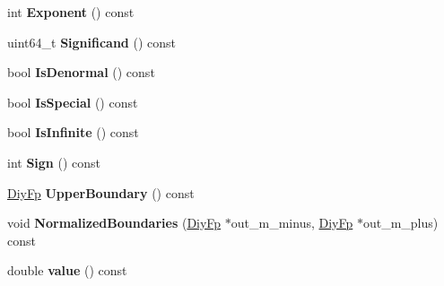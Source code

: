 \begin{DoxyCompactItemize}
\item 
\hypertarget{classv8_1_1internal_1_1_double_ab9695306713296276c93561af462b7d3}{}int {\bfseries Exponent} () const \label{classv8_1_1internal_1_1_double_ab9695306713296276c93561af462b7d3}

\item 
\hypertarget{classv8_1_1internal_1_1_double_aab2ba17924404388a43b18356fb96cd8}{}uint64\+\_\+t {\bfseries Significand} () const \label{classv8_1_1internal_1_1_double_aab2ba17924404388a43b18356fb96cd8}

\item 
\hypertarget{classv8_1_1internal_1_1_double_a2bd3977ee8b66067a0f6724643f18268}{}bool {\bfseries Is\+Denormal} () const \label{classv8_1_1internal_1_1_double_a2bd3977ee8b66067a0f6724643f18268}

\item 
\hypertarget{classv8_1_1internal_1_1_double_a75c994211c852906f1fe88772fc271ac}{}bool {\bfseries Is\+Special} () const \label{classv8_1_1internal_1_1_double_a75c994211c852906f1fe88772fc271ac}

\item 
\hypertarget{classv8_1_1internal_1_1_double_a4614a72d0bdc52f54b25246449f86496}{}bool {\bfseries Is\+Infinite} () const \label{classv8_1_1internal_1_1_double_a4614a72d0bdc52f54b25246449f86496}

\item 
\hypertarget{classv8_1_1internal_1_1_double_ac72f0af8be136a54328315083cdf4314}{}int {\bfseries Sign} () const \label{classv8_1_1internal_1_1_double_ac72f0af8be136a54328315083cdf4314}

\item 
\hypertarget{classv8_1_1internal_1_1_double_a29e22dbcea8dc7c99c5c0e7c3423eca7}{}\hyperlink{classv8_1_1internal_1_1_diy_fp}{Diy\+Fp} {\bfseries Upper\+Boundary} () const \label{classv8_1_1internal_1_1_double_a29e22dbcea8dc7c99c5c0e7c3423eca7}

\item 
\hypertarget{classv8_1_1internal_1_1_double_a210b004181bc1b4aa2251676888ef3a8}{}void {\bfseries Normalized\+Boundaries} (\hyperlink{classv8_1_1internal_1_1_diy_fp}{Diy\+Fp} $\ast$out\+\_\+m\+\_\+minus, \hyperlink{classv8_1_1internal_1_1_diy_fp}{Diy\+Fp} $\ast$out\+\_\+m\+\_\+plus) const \label{classv8_1_1internal_1_1_double_a210b004181bc1b4aa2251676888ef3a8}

\item 
\hypertarget{classv8_1_1internal_1_1_double_ac46d9514c6833c1c8ebd51aa354b05cf}{}double {\bfseries value} () const \label{classv8_1_1internal_1_1_double_ac46d9514c6833c1c8ebd51aa354b05cf}

\end{DoxyCompactItemize}
